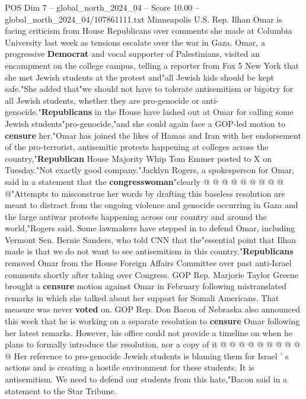 \begin{textsample}{POS Dim 7 – global\_north\_2024\_04 – Score 10.00 – global\_north\_2024\_04/107861111.txt}  \label{ex:f7_pos_069}
Minneapolis U.S.
Rep.
Ilhan Omar is facing criticism from House Republicans over comments she made at Columbia University last week as tensions escalate over the war in Gaza.
Omar, a progressive \textbf{Democrat} and vocal supporter of Palestinians, visited an encampment on the college campus, telling a reporter from Fox 5 New York that she met Jewish students at the protest and"all Jewish kids should be kept safe."She added that"we should not have to tolerate antisemitism or bigotry for all Jewish students, whether they are pro-genocide or anti-genocide."\textbf{Republicans} in the House have lashed out at Omar for calling some Jewish students"pro-genocide,"and she could again face a GOP-led motion to \textbf{censure} her."Omar has joined the likes of Hamas and Iran with her endorsement of the pro-terrorist, antisemitic protests happening at colleges across the country,"\textbf{Republican} House Majority Whip Tom Emmer posted to X on Tuesday."Not exactly good company."Jacklyn Rogers, a spokesperson for Omar, said in a statement that the \textbf{congresswoman}"clearly @ @ @ @ @ @ @ @ @ @"Attempts to misconstrue her words by drafting this baseless resolution are meant to distract from the ongoing violence and genocide occurring in Gaza and the large antiwar protests happening across our country and around the world,"Rogers said.
Some lawmakers have stepped in to defend Omar, including Vermont Sen.
Bernie Sanders, who told CNN that the"essential point that Ilhan made is that we do not want to see antisemitism in this country."\textbf{Republicans} removed Omar from the House Foreign Affairs Committee over past anti-Israel comments shortly after taking over Congress.
GOP Rep.
Marjorie Taylor Greene brought a \textbf{censure} motion against Omar in February following mistranslated remarks in which she talked about her support for Somali Americans.
That measure was never \textbf{voted} on.
GOP Rep.
Don Bacon of Nebraska also announced this week that he is working on a separate resolution to \textbf{censure} Omar following her latest remarks.
However, his office could not provide a timeline on when he plans to formally introduce the resolution, nor a copy of it @ @ @ @ @ @ @ @ @ @ Her reference to pro-genocide Jewish students is blaming them for Israel ' s actions and is creating a hostile environment for these students.
It is antisemitism.
We need to defend our students from this hate,"Bacon said in a statement to the Star Tribune.

\end{textsample}

